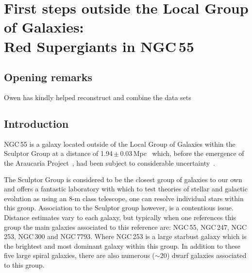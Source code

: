 \chapter{First steps outside the Local Group of Galaxies:\\
Red Supergiants in NGC\,55}





\section{Opening remarks} %
\label{sec:opening_remarks}

Owen has kindly helped reconstruct and combine the data sets


\section{Introduction} %
\label{sec:introduction}

NGC\,55 is a galaxy located outside of the Local Group of Galaxies within the Sculptor Group at a distance of 1.94\,$\pm$\,0.03\,Mpc~\citep{2006AJ....132.2556P,2008ApJ...672..266G} which, before the emergence of the Araucaria Project~\citep{2005Msngr.121...23G}, had been subject to considerable uncertainty~\citep[e.g.][]{1987ApJ...323...79P,2006A&A...455..891V}.

The Sculptor Group is considered to be the closest group of galaxies to our own and offers a fantastic laboratory with which to test theories of stellar and galactic evolution as using an 8-m class telescope, one can resolve individual stars within this group.
Association to the Sculptor group however, is a contentious issue.
Distance estimates vary to each galaxy, but typically when one references this group the main galaxies associated to this reference are: NGC\,55, NGC\,247, NGC\,253, NGC\,300 and NGC\,7793.
Where NGC\,253 is a large starbust galaxy which is the brightest and most dominant galaxy within this group.
In addition to these five large spiral galaxies, there are also numerous ($\sim$20) dwarf galaxies associated to this group.

